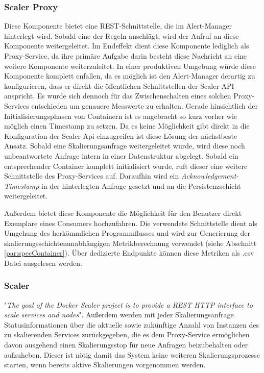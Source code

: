 \subsubsection{Scaler Proxy \checkmark}
Diese Komponente bietet eine REST-Schnittstelle, die im Alert-Manager hinterlegt wird. Sobald eine der Regeln anschlägt, wird der Aufruf an diese Komponente weitergeleitet. Im Endeffekt dient diese Komponente lediglich als Proxy-Service, da ihre primäre Aufgabe darin besteht diese Nachricht an eine weitere Komponente weiterzuleitet. In einer produktiven Umgebung würde diese Komponente komplett enfallen, da es möglich ist den Alert-Manager derartig zu konfigurieren, dass er direkt die öffentlichen Schnittstellen der Scaler-API anspricht. Es wurde sich dennoch für das Zwischenschalten eines solchen Proxy-Services entschieden um genauere Messwerte zu erhalten. Gerade hinsichtlich der Initialisierungsphasen von Containern ist es angebracht so kurz vorher wie möglich einen Timestamp zu setzen. Da es keine Möglichkeit gibt direkt in die Konfiguration der Scaler-Api einzugreifen ist diese Lösung der nächstbeste Ansatz. Sobald eine Skalierungsanfrage weitergeleitet wurde, wird diese noch unbeantwortete Anfrage intern in einer Datenstruktur abgelegt. Sobald ein entsprechender Container komplett initialisiert wurde, ruft dieser eine weitere Schnittstelle des Proxy-Services auf. Daraufhin wird ein \emph{Acknowledgement-Timestamp} in der hinterlegten Anfrage gesetzt und an die Persistenzschicht weitergeleitet. 

Außerdem bietet diese Komponente die Möglichkeit für den Benutzer direkt Exemplare eines Consumers hochzufahren. Die verwendete Schnittstelle dient als Umgehung des herkömmlichen Programmflusses und wird zur Generierung der skalierungsschichtenunabhängigen Metrikberechnung verwendet (siehe Abschnitt \ref{par:specContainer}). Über dedizierte Endpunkte können diese Metriken als .csv Datei ausgelesen werden. 


\subsubsection{Scaler \checkmark}
"\emph{The goal of the Docker Scaler project is to provide a REST HTTP interface to scale services and nodes}"\cite{docker-scaler}. Außerdem werden mit jeder Skalierungsanfrage Statusinformationen über die aktuelle sowie zukünftige Anzahl von Instanzen des zu skalierenden Services zurückgegeben, die es dem Proxy-Service ermöglichen davon ausgehend einen Skalierungsstop für neue Anfragen beizubehalten oder aufzuheben. Dieser ist nötig damit das System keine weiteren Skalierungsprozesse starten, wenn bereits aktive Skalierungen vorgenommen werden.


